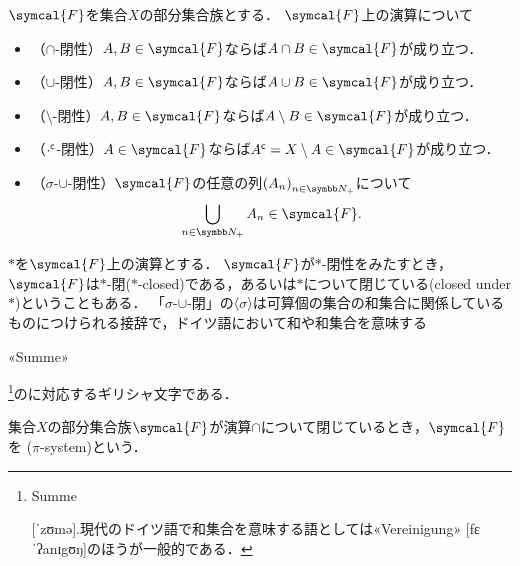 \documentclass[../main.tex]{subfiles}
\begin{document}
\(\symcal{F}\)を集合\(X\)の部分集合族とする．
\(\symcal{F}\)上の演算について
\begin{itemize}
    \item （\(\mathord{\cap}\)-閉性）\(A, B \in \symcal{F}\)ならば\(A \cap B \in \symcal{F}\)が成り立つ．
    \item （\(\mathord{\cup}\)-閉性）\(A, B \in \symcal{F}\)ならば\(A \cup B \in \symcal{F}\)が成り立つ．
    \item （\(\mathord{\setminus}\)-閉性）\(A, B \in \symcal{F}\)ならば\(A \setminus B \in \symcal{F}\)が成り立つ．
    \item （\({\mathord{\cdot}}^{\mathsf{c}}\)-閉性）\(A \in \symcal{F}\)ならば\(\setcomp{A} = X \setminus A \in \symcal{F}\)が成り立つ．
    \item （\(\sigma\)-\(\mathord{\cup}\)-閉性）\(\symcal{F}\)の任意の列\(\Sequence{A}\)について
        \begin{align*}
            \bigcup_{n \in \PositiveInteger} A_n \in \symcal{F}.
        \end{align*}
\end{itemize}
\(\mathord{*}\)を\(\symcal{F}\)上の演算とする．
\(\symcal{F}\)が\(\mathord{*}\)-閉性をみたすとき，\(\symcal{F}\)は\(\mathord{*}\)-閉(\(\mathord{*}\)-closed)である，あるいは\(\mathord{*}\)について閉じている(closed under \(\mathord{*}\))ということもある．
「\(\sigma\)-\(\mathord{\cup}\)-閉」の〈\(\sigma\)〉は可算個の集合の和集合に関係しているものにつけられる接辞で，ドイツ語において和や和集合を意味する\begin{german}«Summe»\end{german}\footnote{\begin{german}Summe\end{german} [ˈzʊmə].現代のドイツ語で和集合を意味する語としては\textgerman{«Vereinigung»} [fɛˈʔanɪgʊŋ]のほうが一般的である．
}のに対応するギリシャ文字である．

\begin{thmbox}
\begin{definition}
集合\(X\)の部分集合族\(\symcal{F}\)が演算\(\mathord{\cap}\)について閉じているとき，\(\symcal{F}\)を
(\(\pi\)-system)という．
\end{definition}
\end{thmbox}
\end{document}

